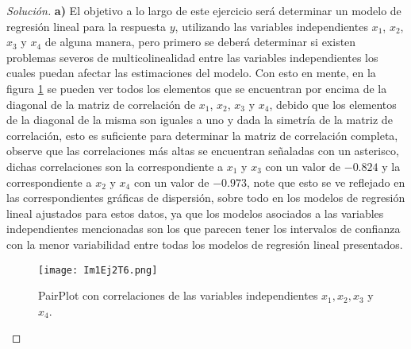 \documentclass[10.5pt,notitlepage]{article}
\newenvironment{solucion}
  {\begin{proof}[Solución]}
  {\end{proof}}
\theoremstyle{plain}
\begin{document}
\begin{solucion}
\noindent \textbf{a)} El objetivo a lo largo de este ejercicio será determinar un modelo de regresión lineal para la respuesta \(y\), utilizando las variables independientes \(x_1\), \(x_2\), \(x_3\) y \(x_4\) de alguna manera, pero primero se deberá determinar si existen problemas severos de multicolinealidad entre las variables independientes los cuales puedan afectar las estimaciones del modelo. Con esto en mente, en la figura \ref{fig:7} se pueden ver todos los elementos que se encuentran por encima de la diagonal de la matriz de correlación de \(x_1\), \(x_2\), \(x_3\) y \(x_4\), debido que los elementos de la diagonal de la misma son iguales a uno y dada la simetría de la matriz de correlación, esto es suficiente para determinar la matriz de correlación completa, observe que las correlaciones más altas se encuentran señaladas con un asterisco, dichas correlaciones son la correspondiente a \(x_1\) y \(x_3\) con un valor de \(-0.824\) y la correspondiente a \(x_2\) y \(x_4\) con un valor de \(-0.973\), note que esto se ve reflejado en las correspondientes gráficas de dispersión, sobre todo en los modelos de regresión lineal ajustados para estos datos, ya que los modelos asociados a las variables independientes mencionadas son los que parecen tener los intervalos de confianza con la menor variabilidad entre todas los modelos de regresión lineal presentados.\\      
\begin{figure}[htb]
 \centering
 \texttt{[image: Im1Ej2T6.png]}
 \caption{PairPlot con correlaciones de las variables independientes \(x_1,x_2,x_3\) y \(x_4\).}
\label{fig:7}
\end{figure}


\end{solucion}
\end{document}
